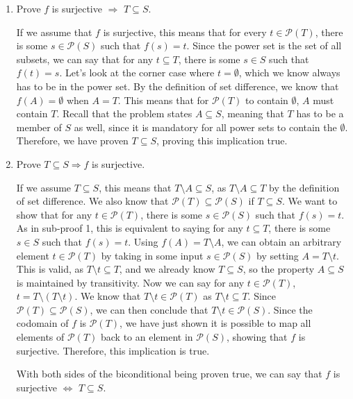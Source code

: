 \documentclass{article}
\begin{document}
\begin{enumerate}

\item Prove $f$ is surjective $\Rightarrow$ $T \subseteq S$. 

If we assume that $f$ is surjective, this means that for every $t \in \mathcal{P}(T)$, there is some $s \in \mathcal{P}(S)$ such that $f(s) = t$. Since the power set is the set of all subsets, we can say that for any $t \subseteq T$, there is some $s \in S$ such that $f(t) = s$. Let's look at the corner case where $t = \emptyset$, which we know always has to be in the power set. By the definition of set difference, we know that $f(A) = \emptyset$ when $A = T$. This means that for $\mathcal{P}(T)$ to contain $\emptyset$, $A$ must contain $T$. Recall that the problem states $A \subseteq S$, meaning that $T$ has to be a member of $S$ as well, since it is mandatory for all power sets to contain the $\emptyset$. Therefore, we have proven $T \subseteq S$, proving this implication true.

\item Prove $T \subseteq S \Rightarrow f$ is surjective. 

If we assume $T \subseteq S$, this means that $T \setminus A \subseteq S$, as $T \setminus A \subseteq T$ by the definition of set difference. We also know that $\mathcal{P}(T) \subseteq \mathcal{P}(S)$ if $T \subseteq S$. We want to show that for any $t \in \mathcal{P}(T)$, there is some $s \in \mathcal{P}(S)$ such that $f(s) = t$. As in sub-proof 1, this is equivalent to saying for any $t \subseteq T$, there is some $s \in S$ such that $f(s) = t$. Using $f(A) = T \setminus A$, we can obtain an arbitrary element $t \in \mathcal{P}(T)$ by taking in some input $s \in \mathcal{P}(S)$ by setting $A = T \setminus t$. This is valid, as $T \setminus t \subseteq T$, and we already know $T \subseteq S$, so the property $A \subseteq S$ is maintained by transitivity. Now we can say for any $t \in \mathcal{P}(T)$, $t = T \setminus (T \setminus t)$. We know that $T \setminus t \in \mathcal{P}(T)$ as $T \setminus t \subseteq T$. Since $\mathcal{P}(T) \subseteq \mathcal{P}(S)$, we can then conclude that $T \setminus t \in \mathcal{P}(S)$. Since the codomain of $f$ is $\mathcal{P}(T)$, we have just shown it is possible to map all elements of $\mathcal{P}(T)$ back to an element in $\mathcal{P}(S)$, showing that $f$ is surjective. Therefore, this implication is true.

With both sides of the biconditional being proven true, we can say that $f$ is surjective $\iff$ $T \subseteq S$.

\end{enumerate}
\end{document}
